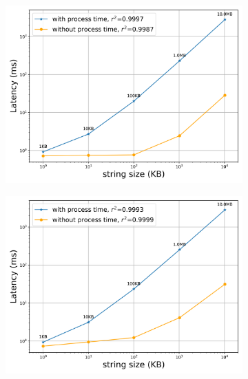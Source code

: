 \begin{figure}[htb]
    \centering
    \begin{subfigure}{0.49\textwidth}
        \centering
        \includegraphics[width=\textwidth]{figures/tests/proportional_tests/log_Average_string_messages_sending_time_of_100_tests_1KB_to_10MB.png}
        \caption{} \label{fig: proportional-stringsize-c}
    \end{subfigure}
    \begin{subfigure}{0.49\textwidth}
        \centering
        \includegraphics[width=\textwidth]{figures/tests/proportional_tests/log_Average_string_messages_receiving_time_of_100_tests_1KB_to_10MB.png}
        \caption{} \label{fig: proportional-stringsize-d}
    \end{subfigure}


\end{figure}
